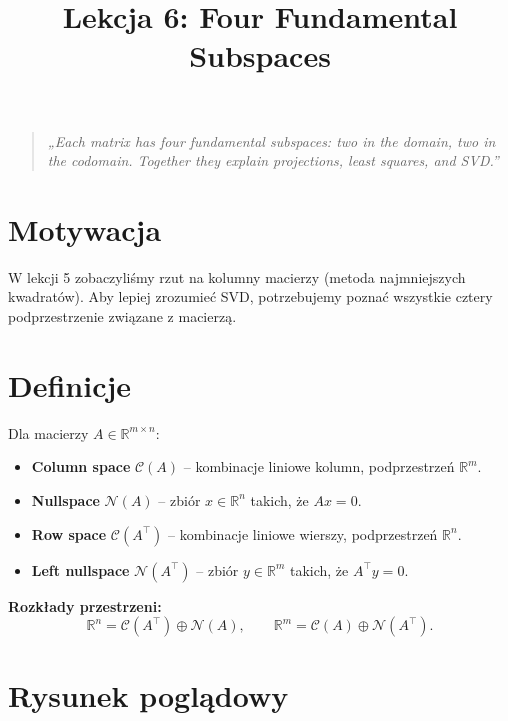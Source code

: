 \documentclass[12pt]{article}
\title{Lekcja 6: Four Fundamental Subspaces}
\author{}
\date{}
\begin{document}
\maketitle

\begin{quote}
\emph{„Each matrix has four fundamental subspaces: two in the domain,
two in the codomain. Together they explain projections, least squares, and SVD.”}
\end{quote}

\section*{Motywacja}
W lekcji 5 zobaczyliśmy rzut na kolumny macierzy (metoda najmniejszych kwadratów).
Aby lepiej zrozumieć SVD, potrzebujemy poznać wszystkie cztery podprzestrzenie
związane z macierzą.

\section*{Definicje}
Dla macierzy $A\in\mathbb{R}^{m\times n}$:
\begin{itemize}
  \item \textbf{Column space} $\mathcal{C}(A)$ – kombinacje liniowe kolumn, podprzestrzeń $\mathbb{R}^m$.
  \item \textbf{Nullspace} $\mathcal{N}(A)$ – zbiór $x\in\mathbb{R}^n$ takich, że $Ax=0$.
  \item \textbf{Row space} $\mathcal{C}(A^\top)$ – kombinacje liniowe wierszy, podprzestrzeń $\mathbb{R}^n$.
  \item \textbf{Left nullspace} $\mathcal{N}(A^\top)$ – zbiór $y\in\mathbb{R}^m$ takich, że $A^\top y=0$.
\end{itemize}

\textbf{Rozkłady przestrzeni:}
\[
\mathbb{R}^n = \mathcal{C}(A^\top) \oplus \mathcal{N}(A), \qquad
\mathbb{R}^m = \mathcal{C}(A) \oplus \mathcal{N}(A^\top).
\]

\section*{Rysunek poglądowy}
\begin{center}
\end{center}
\end{document}
